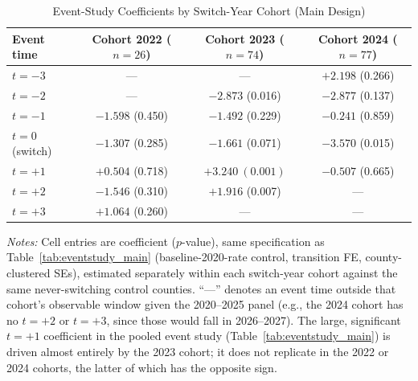 \begin{table}[htbp]
\centering
\caption{Event-Study Coefficients by Switch-Year Cohort (Main Design)}
\label{tab:cohort_composition}
\begin{tabular}{lccc}
\toprule
Event time & Cohort 2022 ($n=26$) & Cohort 2023 ($n=74$) & Cohort 2024 ($n=77$) \\
\midrule
$t=-3$ & --- & --- & $+2.198$ (0.266) \\
$t=-2$ & --- & $-2.873$ (0.016) & $-2.877$ (0.137) \\
$t=-1$ & $-1.598$ (0.450) & $-1.492$ (0.229) & $-0.241$ (0.859) \\
$t=0$ (switch) & $-1.307$ (0.285) & $-1.661$ (0.071) & $-3.570$ (0.015) \\
$t=+1$ & $+0.504$ (0.718) & $\mathbf{+3.240\ (0.001)}$ & $-0.507$ (0.665) \\
$t=+2$ & $-1.546$ (0.310) & $+1.916$ (0.007) & --- \\
$t=+3$ & $+1.064$ (0.260) & --- & --- \\
\bottomrule
\end{tabular}
\begin{minipage}{0.95\textwidth}
\vspace{0.3em}
\footnotesize
\textit{Notes:} Cell entries are coefficient ($p$-value), same specification as Table~\ref{tab:eventstudy_main}
(baseline-2020-rate control, transition FE, county-clustered SEs), estimated separately within each switch-year
cohort against the same never-switching control counties. ``---'' denotes an event time outside that cohort's
observable window given the 2020--2025 panel (e.g., the 2024 cohort has no $t=+2$ or $t=+3$, since those would fall
in 2026--2027). The large, significant $t=+1$ coefficient in the pooled event study (Table~\ref{tab:eventstudy_main})
is driven almost entirely by the 2023 cohort; it does not replicate in the 2022 or 2024 cohorts, the latter of
which has the opposite sign.
\end{minipage}
\end{table}
